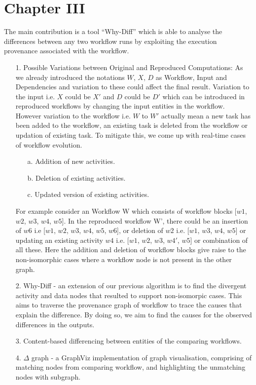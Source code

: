 \documentclass[10pt,conference,twocolumn]{IEEEtran}
\begin{document}
\section{Chapter III}
The main contribution is  a tool \enquote{Why-Diff}  which is able to analyse the differences between any two workflow runs by exploiting the execution provenance associated with the workflow.  
\begin{itemize}
\item[1.] Possible Variations between Original and Reproduced Computations: As we already introduced the notations {$W$, $X$, $D$} as Workflow, Input and Dependencies and variation to these could affect the final result. Variation to the input i.e. $X$ could be $X'$ and $D$ could be $D'$ which can be introduced in reproduced workflows by changing the input entities in the workflow. However variation to the workflow i.e. $W$ to $W'$ actually mean a new task has been added to the workflow, an existing task is deleted from the workflow or updation of existing task. To mitigate this, we come up with real-time cases of workflow evolution.
\begin{itemize}
\item[a.] Addition of new activities.
\item[b.] Deletion of existing activities. 
\item[c.] Updated version of existing activities.
\end{itemize} 
For example consider an Workflow W which consists of workflow blocks [$w1$, $w2$, $w3$, $w4$, $w5$]. In the reproduced workflow W', there could be an insertion of $w6$ i.e [$w1$, $w2$, $w3$, $w4$, $w5$, $w6$], or deletion of $w2$ i.e. [$w1$, $w3$, $w4$, $w5$] or updating an existing activity $w4$ i.e. [$w1$, $w2$, $w3$, $w4'$, $w5$] or combination of all these. Here the addition and deletion of workflow blocks give raise to the non-isomorphic cases where a workflow node is not present in the other graph.
\item[2.] Why-Diff - an extension of our previous algorithm \cite{Priyaa} is to find the divergent activity and data nodes that resulted to support non-isomorpic cases.  This  aims  to traverse the provenance graph of workflow to trace the causes that explain the difference. By doing so, we aim to find the causes for the observed differences in the outputs. 
\item[3.] Content-based differencing between entities of the comparing workflows.
\item[4.] $\Delta$ graph - a GraphViz implementation of graph visualisation, comprising of matching nodes from comparing workflow, and highlighting the unmatching nodes with subgraph.
\end{itemize} 
\end{document}

